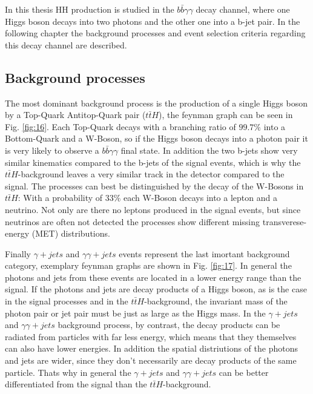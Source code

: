 \label{sec:prep}

In this thesis HH production is studied in the $b \bar{b} \gamma \gamma$ decay channel, where one Higgs boson decays into two photons
and the other one into a b-jet pair. In the following chapter the background processes and event selection criteria regarding this decay channel are described.

\subsection{Background processes}
\label{sec:bkgproccess}

The most dominant background process is the production of a single Higgs boson by a Top-Quark Antitop-Quark pair ($t\bar{t}H$), the feynman graph can be seen in Fig. \ref{fig:16}.
Each Top-Quark decays with a branching ratio of $99.7 \%$ into a Bottom-Quark and a W-Boson, so if the Higgs boson decays into a photon pair
it is very likely to observe a $b \bar{b} \gamma \gamma$ final state. In addition the two b-jets show very similar kinematics compared to the 
b-jets of the signal events, which is why the $t\bar{t}H$-background leaves a very similar track in the detector compared to the signal.
The processes can best be distinguished by the decay of the W-Bosons in $t\bar{t}H$: With a probability of $33 \%$ each W-Boson decays into
a lepton and a neutrino. Not only are there no leptons produced in the signal events, but since neutrinos are often not detected the processes
show different missing transverese-energy (MET) distributions. \\


Finally $\gamma  + jets$ and $\gamma \gamma  + jets$ events represent the last imortant background category, exemplary feynman graphs are shown in Fig. \ref{fig:17}.
In general the photons and jets from these events are located in a lower energy range than the signal. If the photons and jets are decay products of a Higgs boson,
as is the case in the signal processes and in the $t \bar{t} H$-background, the invariant mass of the photon pair or jet pair must be just as large as the Higgs mass. In the $\gamma  + jets$ and $\gamma \gamma  + jets$
background process, by contrast, the decay products can be radiated from particles with far less energy, which means that they themselves can also have lower energies. 
In addition the spatial distriutions of the photons and jets are wider, since they don't necessarily are decay products
of the same particle. Thats why in general the $\gamma  + jets$ and $\gamma \gamma  + jets$ can be better differentiated from the signal than
the $t\bar{t}H$-background. \\

